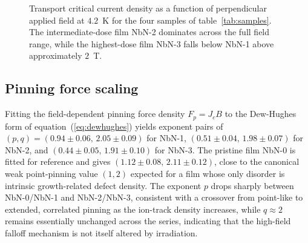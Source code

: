 \begin{figure}[!h]
\centering
{}
\caption{Transport critical current density as a function of perpendicular applied field at $4.2$~K for the four samples of table~\ref{tab:samples}. The intermediate-dose film NbN-2 dominates across the full field range, while the highest-dose film NbN-3 falls below NbN-1 above approximately $2$~T.}
\label{fig:jch}
\end{figure}

\subsection{Pinning force scaling}
Fitting the field-dependent pinning force density $F_p = J_c B$ to the Dew-Hughes form of equation~(\ref{eq:dewhughes}) yields exponent pairs of $(p,q) = (0.94\pm0.06,\,2.05\pm0.09)$ for NbN-1, $(0.51\pm0.04,\,1.98\pm0.07)$ for NbN-2, and $(0.44\pm0.05,\,1.91\pm0.10)$ for NbN-3. The pristine film NbN-0 is fitted for reference and gives $(1.12\pm0.08,\,2.11\pm0.12)$, close to the canonical weak point-pinning value $(1,2)$ expected for a film whose only disorder is intrinsic growth-related defect density. The exponent $p$ drops sharply between NbN-0/NbN-1 and NbN-2/NbN-3, consistent with a crossover from point-like to extended, correlated pinning as the ion-track density increases, while $q\approx2$ remains essentially unchanged across the series, indicating that the high-field falloff mechanism is not itself altered by irradiation.
